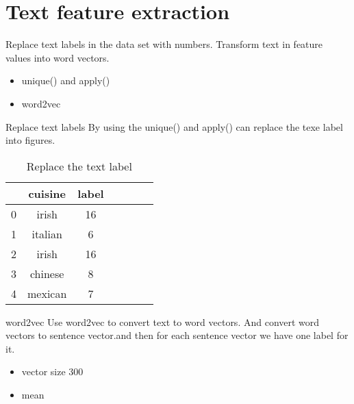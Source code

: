 \documentclass[
 size=12pt,
 paper=smartboard, %
 mode=present, %
 display=slides, %
style=tuliplab,
pauseslide,
fleqn,leqno]{powerdot}
\begin{document}
\section{Text feature extraction}

\begin{slide}{}
Replace text labels in the data set with numbers. Transform text in feature values into word vectors.\\
\vspace{1cm}
\begin{itemize}
  \item unique() and apply()
  \item word2vec
\end{itemize}
\end{slide}

\begin{slide}{Replace text labels}
By using the unique() and apply() can replace the texe label into figures.\\
\begin{table}[htbp]  \centering
  \caption{Replace the text label}
  \label{tbl:data information}
  \begin{tabular}{ccccccc}
    & cuisine  & label\\
    \hline
    0  & irish   & 16 \\
    1  & italian & 6  \\
    2  & irish   & 16 \\
    3  & chinese & 8  \\
    4  & mexican & 7  \\
    \hline 
  \end{tabular}
\end{table}

  \vspace{1cm}
  \end{slide}

\begin{slide}{word2vec}
Use word2vec to convert text to word vectors. And convert word vectors to sentence vector.and then for each 
sentence vector we have one label for it.\\
\begin{itemize}
  \item vector size 300
  \item mean
\end{itemize}
\vspace{1cm}
\end{slide}
\end{document}
